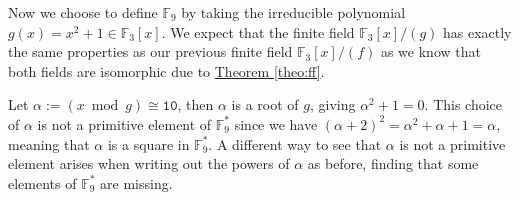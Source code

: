 \documentclass[openany, a4paper, 10pt]{book}
\theoremstyle{plain}
\theoremstyle{plain}
\theoremstyle{plain}
\theoremstyle{definition}
\theoremstyle{plain}
\theoremstyle{definition}
\theoremstyle{remark}
\newcommand{\theoref}[1]{\hyperref[#1]{Theorem \ref{#1}}}
\begin{document}
\begin{examplebox}
    Now we choose to define $\mathbb F_9$ by taking the irreducible polynomial $g(x) = x^2 + 1 \in \mathbb F_3[x]$.
    We expect that the finite field $\mathbb F_3[x]/(g)$ has exactly the same properties as our previous finite field $\mathbb F_3[x]/(f)$ as we know that both fields are isomorphic due to \theoref{theo:ff}.

    Let $\alpha := (x \bmod g) \cong \texttt{10}$, then $\alpha$ is a root of $g$, giving $\alpha^2+1=0$.
    This choice of $\alpha$ is not a primitive element of $\mathbb F_9^*$ since we have $(\alpha+2)^2 = \alpha^2 + \alpha + 1 = \alpha$, meaning that $\alpha$ is a square in $\mathbb F_9^*$.
    A different way to see that $\alpha$ is not a primitive element arises when writing out the powers of $\alpha$ as before, finding that some elements of $\mathbb F_9^*$ are missing.


\end{examplebox}
\end{document}
